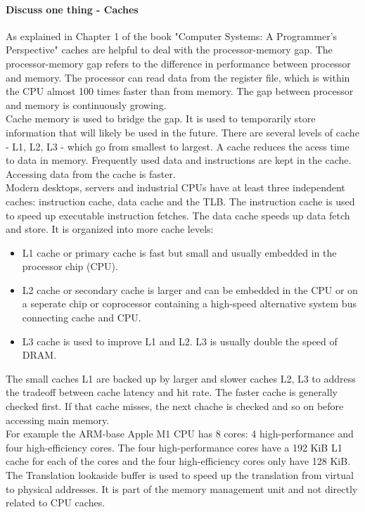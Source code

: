 \documentclass[runningheads]{llncs}
\begin{document}
\paragraph{Discuss one thing - Caches}
As explained in Chapter 1 of the book "Computer Systems: A Programmer’s Perspective" caches are helpful to deal with the processor-memory gap. 
The processor-memory gap refers to the difference in performance between processor and memory.
The processor can read data from the register file, which is within the CPU almost 100 times faster than from memory. 
The gap between processor and memory is continuously growing. 
\\
Cache memory is used to bridge the gap. It is used to temporarily store information that will likely be used in the future. 
There are several levels of cache -  L1, L2, L3 - which go from smallest to largest. 
A cache reduces the acess time to data in memory. Frequently used data and instructions are kept in the cache. 
Accessing data from the cache is faster.
\\
Modern desktops, servers and industrial CPUs have at least three independent caches: instruction cache, data cache and the TLB. 
The instruction cache is used to speed up executable instruction fetches. The data cache speeds up data fetch and store. 
It is organized into more cache levels:
\begin{itemize}
	\item L1 cache or primary cache is fast but small and usually embedded in the processor chip (CPU).
	\item L2 cache or secondary cache is larger and can be embedded in the CPU or on a seperate chip or coprocessor containing 
	a high-speed alternative system bus connecting cache and CPU.
	\item L3 cache is used to improve L1 and L2. L3 is usually double the speed of DRAM.
\end{itemize}
The small caches L1 are backed up by larger and slower caches L2, L3 to address the tradeoff between cache latency and hit rate. 
The faster cache is generally checked first. If that cache misses, the next chache is checked and so on before accessing main memory.
\\
For example the ARM-base Apple M1 CPU has 8 cores: 4 high-performance and four high-efficiency cores. 
The four high-performance cores have a 192 KiB L1 cache for each of the cores and the four high-efficiency cores only have 128 KiB.
\\
The Translation lookaside buffer is used to speed up the translation from virtual to physical addresses. 
It is part of the memory management unit and not directly related to CPU caches.
\end{document}
